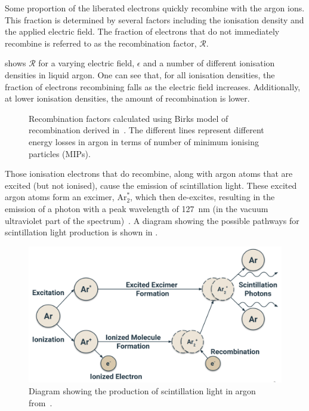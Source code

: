 Some proportion of the liberated electrons quickly recombine with the argon ions.
This fraction is determined by several factors including the ionisation density and the applied electric field.
The fraction of electrons that do not immediately recombine is referred to as the recombination factor, $\mathcal{R}$.

 shows $\mathcal{R}$ for a varying electric field, $\epsilon$ and a number of different ionisation densities in liquid argon.
One can see that, for all ionisation densities, the fraction of electrons recombining falls as the electric field increases.
Additionally, at lower ionisation densities, the amount of recombination is lower.

\begin{figure}[h]
  \begin{adjustbox}{max totalsize={.8\linewidth}, center}
    
  \end{adjustbox}
  \caption[Recombination factors for different electric fields and ionisation densities.]{Recombination factors calculated using Birks model of recombination derived in~\cite{recombArgoneut}. The different lines represent different energy losses in argon in terms of number of minimum ionising particles (MIPs).}
  \label{fig:recombFactors}
\end{figure}

Those ionisation electrons that do recombine, along with argon atoms that are excited (but not ionised), cause the emission of scintillation light.
These excited argon atoms form an excimer, $\text{Ar}^{*}_{2}$, which then de-excites, resulting in the emission of a photon with a peak wavelength of \SI{127}{\nano\metre} (in the vacuum ultraviolet part of the spectrum)~\cite{argonScintillation}.
A diagram showing the possible pathways for scintillation light production is shown in .

\begin{figure}[h]
  \centering
  \includegraphics[width=.8\linewidth]{files/figures/dune_detector/scintillationLight}
  \caption[Diagram showing the production of scintillation light in argon.]{Diagram showing the production of scintillation light in argon from~\cite{tdrVol4}.}
  \label{fig:scintillationLight}
\end{figure}

